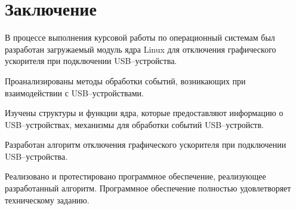 \chapter*{Заключение}

В процессе выполнения курсовой работы по операционный системам был разработан загружаемый модуль ядра Linux для отключения графического ускорителя при подключении USB--устройства.

Проанализированы методы обработки событий, возникающих при взаимодействии с USB--устройствами.

Изучены структуры и функции ядра, которые предоставляют информацию о USB--устройствах, механизмы для обработки событий USB--устройств. 

Разработан алгоритм отключения графического ускорителя при подключении USB--устройства.

Реализовано и протестировано программное обеспечение, реализующее разработанный алгоритм. Программное обеспечение полностью удовлетворяет техническому заданию.